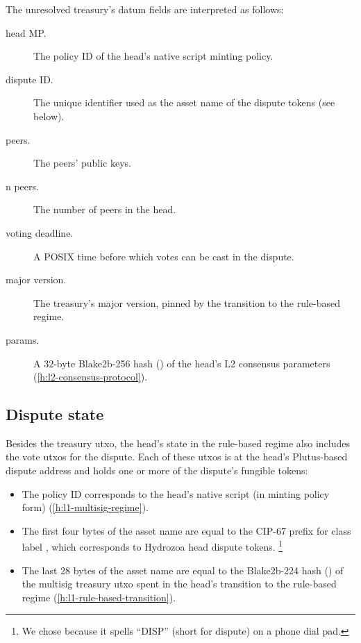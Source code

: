 \documentclass[../hydrozoa.tex]{subfiles}
\begin{document}
The unresolved treasury's datum fields are interpreted as follows:
\begin{description}
  \item[head MP.] The policy ID of the head's native script minting policy.
  \item[dispute ID.] The unique identifier used as the asset name of the dispute tokens (see below).
  \item[peers.] The peers' public keys.
  \item[n peers.] The number of peers in the head.
  \item[voting deadline.] A POSIX time before which votes can be cast in the dispute.
  \item[major version.] The treasury's major version, pinned by the transition to the rule-based regime.
  \item[params.] A 32-byte Blake2b-256 hash () of the head's L2 consensus parameters (\cref{h:l2-consensus-protocol}).
\end{description}

\subsection{Dispute state}

Besides the treasury utxo, the head's state in the rule-based regime also includes the vote utxos for the dispute.
Each of these utxos is at the head's Plutus-based dispute address and holds one or more of the dispute's fungible tokens:
\begin{itemize}
  \item The policy ID corresponds to the head's native script (in minting policy form) (\cref{h:l1-multisig-regime}).
  \item The first four bytes of the asset name are equal to the CIP-67
    \citep{AlessandroKonradThomasVellekoopCIP67AssetName2022}
    prefix for class label \headDisputeToken{}, which corresponds to Hydrozoa head dispute tokens.%
    \footnote{We chose \headDisputeToken{} because it spells ``DISP'' (short for dispute) on a phone dial pad.}
  \item The last 28 bytes of the asset name are equal to the Blake2b-224 hash () of the multisig treasury utxo spent in the head's transition to the rule-based regime (\cref{h:l1-rule-based-transition}).
\end{itemize}
\end{document}
